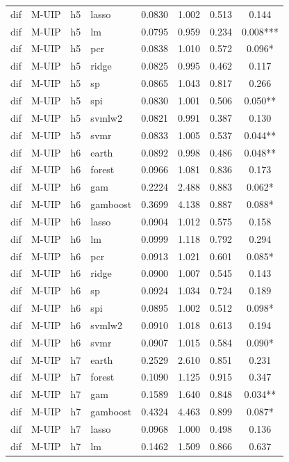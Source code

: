 \begin{ThreePartTable}
\begin{longtable}[t]{llclcccc}
dif & M-UIP & h5 & lasso & 0.0830 & 1.002 & 0.513 & 0.144\\
dif & M-UIP & h5 & lm & 0.0795 & 0.959 & 0.234 & 0.008***\\
dif & M-UIP & h5 & pcr & 0.0838 & 1.010 & 0.572 & 0.096*\\
dif & M-UIP & h5 & ridge & 0.0825 & 0.995 & 0.462 & 0.117\\
dif & M-UIP & h5 & sp & 0.0865 & 1.043 & 0.817 & 0.266\\
dif & M-UIP & h5 & spi & 0.0830 & 1.001 & 0.506 & 0.050**\\
dif & M-UIP & h5 & svmlw2 & 0.0821 & 0.991 & 0.387 & 0.130\\
dif & M-UIP & h5 & svmr & 0.0833 & 1.005 & 0.537 & 0.044**\\
\addlinespace
dif & M-UIP & h6 & earth & 0.0892 & 0.998 & 0.486 & 0.048**\\
dif & M-UIP & h6 & forest & 0.0966 & 1.081 & 0.836 & 0.173\\
dif & M-UIP & h6 & gam & 0.2224 & 2.488 & 0.883 & 0.062*\\
dif & M-UIP & h6 & gamboost & 0.3699 & 4.138 & 0.887 & 0.088*\\
dif & M-UIP & h6 & lasso & 0.0904 & 1.012 & 0.575 & 0.158\\
dif & M-UIP & h6 & lm & 0.0999 & 1.118 & 0.792 & 0.294\\
dif & M-UIP & h6 & pcr & 0.0913 & 1.021 & 0.601 & 0.085*\\
dif & M-UIP & h6 & ridge & 0.0900 & 1.007 & 0.545 & 0.143\\
dif & M-UIP & h6 & sp & 0.0924 & 1.034 & 0.724 & 0.189\\
dif & M-UIP & h6 & spi & 0.0895 & 1.002 & 0.512 & 0.098*\\
dif & M-UIP & h6 & svmlw2 & 0.0910 & 1.018 & 0.613 & 0.194\\
dif & M-UIP & h6 & svmr & 0.0907 & 1.015 & 0.584 & 0.090*\\
\addlinespace
dif & M-UIP & h7 & earth & 0.2529 & 2.610 & 0.851 & 0.231\\
dif & M-UIP & h7 & forest & 0.1090 & 1.125 & 0.915 & 0.347\\
dif & M-UIP & h7 & gam & 0.1589 & 1.640 & 0.848 & 0.034**\\
dif & M-UIP & h7 & gamboost & 0.4324 & 4.463 & 0.899 & 0.087*\\
dif & M-UIP & h7 & lasso & 0.0968 & 1.000 & 0.498 & 0.136\\
dif & M-UIP & h7 & lm & 0.1462 & 1.509 & 0.866 & 0.637\\

\end{longtable}
\end{ThreePartTable}
